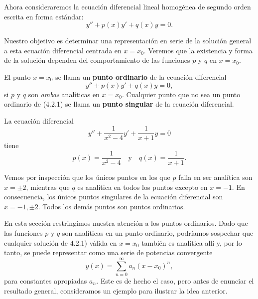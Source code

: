  Ahora consideraremos la ecuación diferencial lineal homogénea de segundo orden escrita en forma estándar:
\[ y'' + p(x)y' + q(x)y = 0. \]

Nuestro objetivo es determinar una representación en serie de la solución general a esta ecuación diferencial centrada en $x = x_0$. Veremos que la existencia y forma de la solución dependen del comportamiento de las funciones $p$ y $q$ en $x = x_0$.

\begin{definition}
    El punto $x = x_0$ se llama un \textbf{punto ordinario} de la ecuación diferencial
\begin{equation} \tag{4.2.1}
y'' + p(x)y' + q(x)y = 0,
\end{equation}
si $p$ y $q$ son \textit{ambas} analíticas en $x = x_0$. Cualquier punto que no sea un punto ordinario de (4.2.1) se llama un \textbf{punto singular} de la ecuación diferencial.

\end{definition}

\begin{example}
    La ecuación diferencial
\[ y'' + \frac{1}{x^2 - 4}y' + \frac{1}{x + 1}y = 0 \]
tiene
\[ p(x) = \frac{1}{x^2 - 4} \quad \text{y} \quad q(x) = \frac{1}{x + 1}. \]

Vemos por inspección que los únicos puntos en los que $p$ falla en ser analítica son $x = \pm 2$, mientras que $q$ es analítica en todos los puntos excepto en $x = -1$. En consecuencia, los únicos puntos singulares de la ecuación diferencial son $x = -1, \pm 2$. Todos los demás puntos son puntos ordinarios. 
\end{example}

\begin{remark}
    En esta sección restringimos nuestra atención a los puntos ordinarios. Dado que las funciones $p$ y $q$ son analíticas en un punto ordinario, podríamos sospechar que cualquier solución de 4.2.1) válida en $x = x_0$ también es analítica allí y, por lo tanto, se puede representar como una serie de potencias convergente
\[ y(x) = \sum_{n=0}^{\infty} a_n(x - x_0)^n, \]
para constantes apropiadas $a_n$. Este es de hecho el caso, pero antes de enunciar el resultado general, consideramos un ejemplo para ilustrar la idea anterior.

\end{remark}


